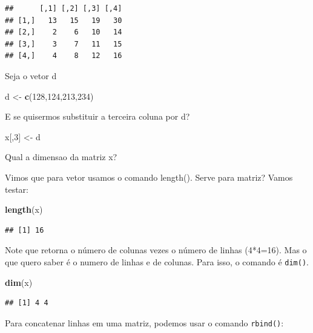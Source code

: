 \documentclass[
]{book}
\newenvironment{Shaded}{\begin{snugshade}}{\end{snugshade}}
\newcommand{\DecValTok}[1]{\textcolor[rgb]{0.00,0.00,0.81}{#1}}
\newcommand{\KeywordTok}[1]{\textcolor[rgb]{0.13,0.29,0.53}{\textbf{#1}}}
\newcommand{\NormalTok}[1]{#1}
\newcommand{\StringTok}[1]{\textcolor[rgb]{0.31,0.60,0.02}{#1}}
\begin{document}
\begin{verbatim}
##      [,1] [,2] [,3] [,4]
## [1,]   13   15   19   30
## [2,]    2    6   10   14
## [3,]    3    7   11   15
## [4,]    4    8   12   16
\end{verbatim}

Seja o vetor d

\begin{Shaded}
\begin{Highlighting}[]
\NormalTok{d <-}\StringTok{ }\KeywordTok{c}\NormalTok{(}\DecValTok{128}\NormalTok{,}\DecValTok{124}\NormalTok{,}\DecValTok{213}\NormalTok{,}\DecValTok{234}\NormalTok{)}
\end{Highlighting}
\end{Shaded}

E se quisermos substituir a terceira coluna por d?

\begin{Shaded}
\begin{Highlighting}[]
\NormalTok{x[,}\DecValTok{3}\NormalTok{] <-}\StringTok{ }\NormalTok{d}
\end{Highlighting}
\end{Shaded}

Qual a dimensao da matriz x?

Vimos que para vetor usamos o comando length(). Serve para matriz? Vamos testar:

\begin{Shaded}
\begin{Highlighting}[]
\KeywordTok{length}\NormalTok{(x)}
\end{Highlighting}
\end{Shaded}

\begin{verbatim}
## [1] 16
\end{verbatim}

Note que retorna o número de colunas vezes o número de linhas (4*4=16). Mas o que quero saber é o numero de linhas e de colunas. Para isso, o comando é \texttt{dim()}.

\begin{Shaded}
\begin{Highlighting}[]
\KeywordTok{dim}\NormalTok{(x)}
\end{Highlighting}
\end{Shaded}

\begin{verbatim}
## [1] 4 4
\end{verbatim}

Para concatenar linhas em uma matriz, podemos usar o comando \texttt{rbind()}:
\end{document}

